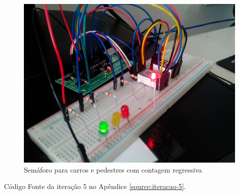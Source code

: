 \begin{figure}[H]
    \includegraphics[scale=0.5]{img/semaforo-3.jpg}
    \caption{Semáforo para carros e pedestres com contagem regressiva} \label{semaforo-3}
\end{figure}

Código Fonte da iteração 5 no Apêndice \ref{source:iteracao-5}.
